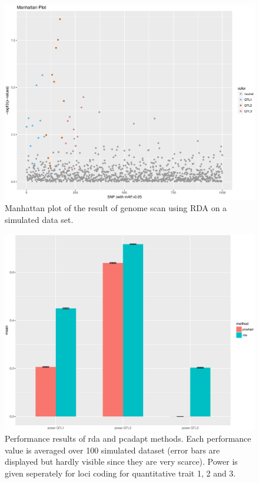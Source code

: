 \documentclass[a4paper,times,10pt,authoryear]{article}%
\begin{document}
\begin{figure}[t]
\begin{center}
\includegraphics[height=0.4\textheight]{figures/sim105_capscale.eps}
\end{center}
\caption{Manhattan plot of the result of genome scan using RDA on a simulated data set.}%
\label{fig:rda}%
\end{figure}


\begin{figure}[t]
\begin{center}
\includegraphics[height=0.4\textheight]{figures/overallresults.eps}
\end{center}
\caption{Performance results of rda and pcadapt methods. Each performance value is averaged over 100 simulated dataset (error bars are displayed but hardly visible since they are very scarce). Power is given seperately for loci coding for quantitative trait 1, 2 and 3.}%
\label{fig:performance}%
\end{figure}
\end{document}
